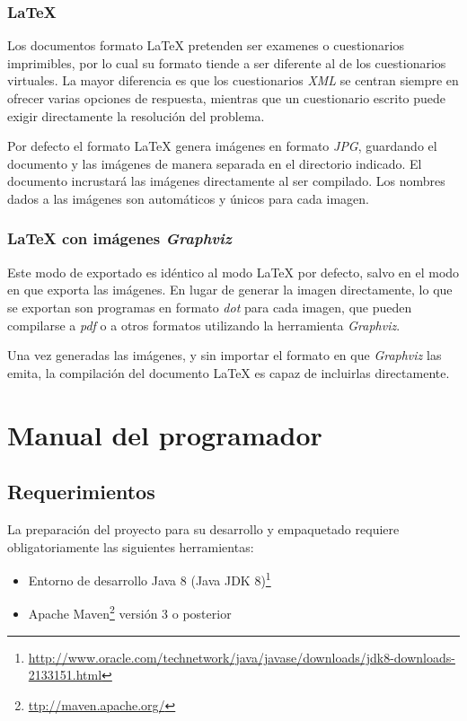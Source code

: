 \subsubsection{\LaTeX{}}
Los documentos formato \LaTeX{} pretenden ser examenes o cuestionarios imprimibles, por lo cual su formato tiende a ser diferente al de los cuestionarios virtuales.
La mayor diferencia es que los cuestionarios \emph{XML} se centran siempre en ofrecer varias opciones de respuesta, mientras que un cuestionario escrito puede exigir directamente la resolución del problema.

Por defecto el formato \LaTeX{} genera imágenes en formato \emph{JPG}, guardando el documento y las imágenes de manera separada en el directorio indicado.
El documento incrustará las imágenes directamente al ser compilado.
Los nombres dados a las imágenes son automáticos y únicos para cada imagen.

\subsubsection{\LaTeX{} con imágenes \emph{Graphviz}}
Este modo de exportado es idéntico al modo \LaTeX{} por defecto, salvo en el modo en que exporta las imágenes.
En lugar de generar la imagen directamente, lo que se exportan son programas en formato \emph{dot} para cada imagen, que pueden compilarse a \emph{pdf} o a otros formatos utilizando la herramienta \emph{Graphviz}.

Una vez generadas las imágenes, y sin importar el formato en que \emph{Graphviz} las emita, la compilación del documento \LaTeX{} es capaz de incluirlas directamente.

\section{Manual del programador}

\subsection{Requerimientos}
La preparación del proyecto para su desarrollo y empaquetado requiere obligatoriamente las siguientes herramientas:
\begin{itemize}
	\item Entorno de desarrollo Java 8 (Java JDK 8)\footnote{\url{http://www.oracle.com/technetwork/java/javase/downloads/jdk8-downloads-2133151.html}}
	\item Apache Maven\footnote{\url{ttp://maven.apache.org/}} versión 3 o posterior
\end{itemize}

